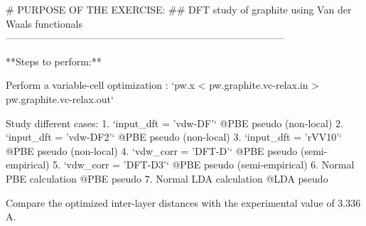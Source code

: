 # PURPOSE OF THE EXERCISE:
## DFT study of graphite using Van der Waals functionals
------------------------------------------------------------------------------------

**Steps to perform:**

   Perform a variable-cell optimization : `pw.x < pw.graphite.vc-relax.in > pw.graphite.vc-relax.out`

   Study different cases:
   1. `input_dft = 'vdw-DF'`    @PBE pseudo (non-local)
   2. `input_dft = 'vdw-DF2'`   @PBE pseudo (non-local)
   3. `input_dft = 'rVV10'`     @PBE pseudo (non-local)
   4. `vdw_corr  = 'DFT-D'`     @PBE pseudo (semi-empirical)
   5. `vdw_corr  = 'DFT-D3'`    @PBE pseudo (semi-empirical)
   6.  Normal PBE calculation   @PBE pseudo
   7.  Normal LDA calculation   @LDA pseudo

   Compare the optimized inter-layer distances with the experimental value of 3.336 A.
